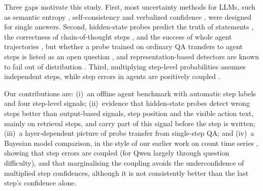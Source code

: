 \documentclass[10pt,twocolumn]{article}
\begin{document}
Three gaps motivate this study. First, most uncertainty methods for LLMs, such as semantic entropy
\citep{kuhn2023semantic,farquhar2024detecting}, self-consistency \citep{wang2023selfconsistency} and verbalized
confidence \citep{xiong2024can}, were designed for single answers. Second, hidden-state probes predict the truth of
statements \citep{azaria2023internal,marks2023geometry}, the correctness of chain-of-thought steps
\citep{ni2026reprobe}, and the success of whole agent trajectories
\citep{mammen2026agents}, but whether a probe trained on ordinary QA transfers to agent steps is listed as an open
question \citep{lin2026uqagents}, and representation-based detectors are known to fail out of distribution
\citep{dubanowska2025representation}. Third, multiplying step-level probabilities assumes independent steps, while
step errors in agents are positively coupled \citep{lin2026uqagents}.

Our contributions are: (i)~an offline agent benchmark with automatic step labels and four step-level signals;
(ii)~evidence that hidden-state probes detect wrong steps better than output-based signals, step position and the
visible action text, mainly on retrieval steps, and carry part of this signal before the step is written; (iii)~a layer-dependent picture of probe transfer from single-step QA; and (iv)~a Bayesian model
comparison, in the style of our earlier work on count time series \citep{shi2026bayesian}, showing that step errors
are coupled (for Qwen largely through question difficulty), and that marginalising the coupling avoids the underconfidence of multiplied step confidences, although
it is not consistently better than the last step's confidence alone.
\end{document}
